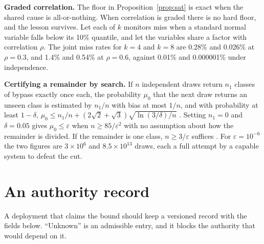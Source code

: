 \documentclass[10pt,twocolumn,letterpaper]{article}
\theoremstyle{definition}
\newcommand{\para}[1]{\smallskip\noindent\textbf{#1}\enspace}
\newcommand{\CopSixFour}{1.4}
\newcommand{\CopSixEight}{0.54}
\newcommand{\CopThreeFour}{0.28}
\newcommand{\CopThreeEight}{0.026}
\begin{document}
\para{Graded correlation.} The floor in Proposition~\ref{prop:sat} is exact when the shared cause is all-or-nothing. When correlation is graded there is no hard floor, and the lesson survives. Let each of $k$ monitors miss when a standard normal variable falls below its 10\% quantile, and let the variables share a factor with correlation $\rho$. The joint miss rates for $k=4$ and $k=8$ are \CopThreeFour\% and \CopThreeEight\% at $\rho=0.3$, and \CopSixFour\% and \CopSixEight\% at $\rho=0.6$, against 0.01\% and 0.000001\% under independence.

\para{Certifying a remainder by search.} If $n$ independent draws return $n_{1}$ classes of bypass exactly once each, the probability $\mu_{0}$ that the next draw returns an unseen class is estimated by $n_{1}/n$ with bias at most $1/n$, and with probability at least $1-\delta$, $\mu_{0}\le n_{1}/n+(2\sqrt{2}+\sqrt{3})\sqrt{\ln(3/\delta)/n}$ \cite{mcallester}. Setting $n_{1}=0$ and $\delta=0.05$ gives $\mu_{0}\le\varepsilon$ when $n\ge 85/\varepsilon^{2}$ with no assumption about how the remainder is divided. If the remainder is one class, $n\ge 3/\varepsilon$ suffices \cite{hanley}. For $\varepsilon=10^{-6}$ the two figures are $3\times10^{6}$ and $8.5\times10^{13}$ draws, each a full attempt by a capable system to defeat the cut.

\section{An authority record}
\label{app:record}

A deployment that claims the bound should keep a versioned record with the fields below. ``Unknown'' is an admissible entry, and it blocks the authority that would depend on it.
\end{document}
